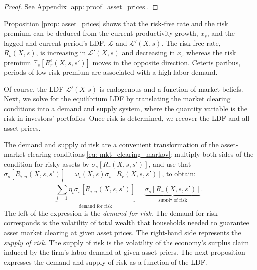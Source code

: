 \begin{proof}
See Appendix \ref{app: proof_asset_prices}.
\end{proof}
Proposition \ref{prop: asset_prices} shows that the risk-free rate and the risk premium can be deduced from the current productivity growth, $x_s$, and the lagged and current period's LDF, $\mathcal{L}$ and $\mathcal{L}'(X,s)$. The risk free rate, $R_{b}(X,s)$, is increasing in $\mathcal{L}'(X,s)$ and decreasing in $x_s$ whereas the risk premium $\mathbb{E}_s[R_{r}^e(X,s,s')]$ moves in the opposite direction. Ceteris paribus, periods of low-risk premium are associated with a high labor demand. 


Of course, the LDF $\mathcal{L}'(X,s)$ is endogenous and a function of market beliefs. 
Next, we solve for the equilibrium LDF by translating the market clearing conditions into a demand and supply system, where the quantity variable is the risk in investors' portfolios. Once risk is determined, we recover the LDF and all asset prices.

The demand and supply of risk are a convenient transformation of the asset-market clearing conditions \eqref{eq: mkt_clearing_markov}: multiply both sides of the condition for risky assets by $\sigma_s[R_r(X,s,s')]$, and use that $\sigma_s[R_{i,n}(X,s,s')] = \omega_{i}(X,s) \sigma_s[R_{r}(X,s,s')]$, to obtain:
\begin{equation*}
    \underbrace{\sum_{i=1}^I \eta_i \sigma_s[R_{i,n}(X,s,s')]}_{\text{demand for risk}} =  \underbrace{\sigma_s[R_r(X,s,s')]}_{\text{supply of risk}}.
\end{equation*}
The left of the expression is the \textit{demand for risk}.  The demand for risk corresponds is the volatility of total wealth that households needed to guarantee asset market clearing at given asset prices.
The right-hand side represents the \textit{supply of risk}. The supply of risk is the volatility of the economy's surplus claim induced by the firm's labor demand at given asset prices. The next proposition expresses the demand and supply of risk as a function of the LDF.
 
